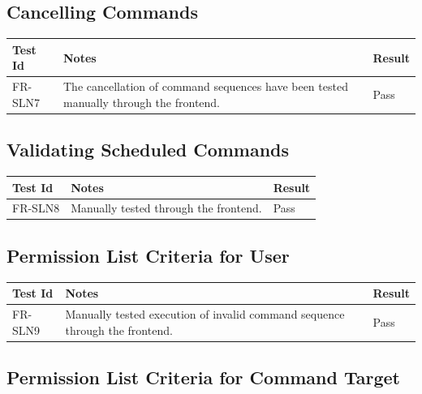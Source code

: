 \documentclass[12pt, titlepage]{article}
\begin{document}
\subsection{Cancelling Commands}

\begin{center}
\begin{tabular}{|p{2cm} | p{8cm} |p{2cm}| }
\hline
\textbf{Test Id} & \textbf{Notes} & \textbf{Result} \\
\hline
FR-SLN7 & The cancellation of command sequences have been tested manually through the frontend. & Pass \\
\hline

\end{tabular}
\end{center}

\subsection{Validating Scheduled Commands}

\begin{center}
\begin{tabular}{|p{2cm} | p{8cm} |p{2cm}| }
\hline
\textbf{Test Id} & \textbf{Notes} & \textbf{Result} \\
\hline
FR-SLN8 & Manually tested through the frontend. & Pass \\
\hline

\end{tabular}
\end{center}

\subsection{Permission List Criteria for User}

\begin{center}
\begin{tabular}{|p{2cm} | p{8cm} |p{2cm}| }
\hline
\textbf{Test Id} & \textbf{Notes} & \textbf{Result} \\
\hline
FR-SLN9 & Manually tested execution of invalid command sequence through the frontend. & Pass \\
\hline

\end{tabular}
\end{center}

\subsection{Permission List Criteria for Command Target}
\end{document}
